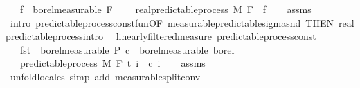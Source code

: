 \begin{isabellebody}
\ \ \ {\isachardoublequoteopen}f\ {\isasymin}\ borel{\isacharunderscore}{\kern0pt}measurable\ {\isacharparenleft}{\kern0pt}F\ {}{\isacharparenright}{\kern0pt}{\isachardoublequoteclose}\isanewline
\ \ \ {\isachardoublequoteopen}real{\isacharunderscore}{\kern0pt}predictable{\isacharunderscore}{\kern0pt}process\ M\ F\ {\isacharparenleft}{\kern0pt}{\isasymlambda}{\isacharunderscore}{\kern0pt}{\isachardot}{\kern0pt}\ f{\isacharparenright}{\kern0pt}{\isachardoublequoteclose}\isanewline
%
\isadelimproof
\ \ %
\endisadelimproof
%
\isatagproof
{}\isamarkupfalse%
\ assms\ \isamarkupfalse%
\ {\isacharparenleft}{\kern0pt}intro\ predictable{\isacharunderscore}{\kern0pt}process{\isacharunderscore}{\kern0pt}const{\isacharunderscore}{\kern0pt}fun{\isacharbrackleft}{\kern0pt}OF\ measurable{\isacharunderscore}{\kern0pt}predictable{\isacharunderscore}{\kern0pt}sigma{\isacharunderscore}{\kern0pt}snd{\isacharprime}{\kern0pt}{\isacharcomma}{\kern0pt}\ THEN\ real{\isacharunderscore}{\kern0pt}predictable{\isacharunderscore}{\kern0pt}process{\isachardot}{\kern0pt}intro{\isacharbrackright}{\kern0pt}{\isacharparenright}{\kern0pt}%
\endisatagproof
{\isafoldproof}%
%
\isadelimproof
\isanewline
%
\endisadelimproof
\isanewline
{}\isamarkupfalse%
\ {\isacharparenleft}{\kern0pt}\ linearly{\isacharunderscore}{\kern0pt}filtered{\isacharunderscore}{\kern0pt}measure{\isacharparenright}{\kern0pt}\ predictable{\isacharunderscore}{\kern0pt}process{\isacharunderscore}{\kern0pt}const{\isacharcolon}{\kern0pt}\isanewline
\ \ \ {\isachardoublequoteopen}fst\ {\isasymin}\ borel{\isacharunderscore}{\kern0pt}measurable\ {\isasymSigma}\isactrlsub P{\isachardoublequoteclose}\ {\isachardoublequoteopen}c\ {\isasymin}\ borel{\isacharunderscore}{\kern0pt}measurable\ borel{\isachardoublequoteclose}\isanewline
\ \ \ {\isachardoublequoteopen}predictable{\isacharunderscore}{\kern0pt}process\ M\ F\ t\ {\isacharparenleft}{\kern0pt}{\isasymlambda}i\ {\isacharunderscore}{\kern0pt}{\isachardot}{\kern0pt}\ c\ i{\isacharparenright}{\kern0pt}{\isachardoublequoteclose}\isanewline
%
\isadelimproof
\ \ %
\endisadelimproof
%
\isatagproof
{}\isamarkupfalse%
\ assms\ \isamarkupfalse%
\ {\isacharparenleft}{\kern0pt}unfold{\isacharunderscore}{\kern0pt}locales{\isacharparenright}{\kern0pt}\ {\isacharparenleft}{\kern0pt}simp\ add{\isacharcolon}{\kern0pt}\ measurable{\isacharunderscore}{\kern0pt}split{\isacharunderscore}{\kern0pt}conv{\isacharparenright}{\kern0pt}%

\end{isabellebody}
